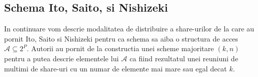 \documentclass{llncs}
\begin{document}

\subsection{Schema Ito, Saito, si Nishizeki}
\label{Ito}

In continuare vom descrie modalitatea de distribuire a share-urilor de la care au pornit Ito, Saito si Nishizeki pentru ca schema sa aiba o structura de acces $\mathcal{A} \subseteq 2^P$. Autorii au pornit de la constructia unei scheme majoritare $(k, n)$ pentru a putea descrie elementele lui $\mathcal{A}$ ca fiind rezultatul unei reuniuni de multimi de share-uri cu un numar de elemente mai mare sau egal decat $k$.
\end{document}
